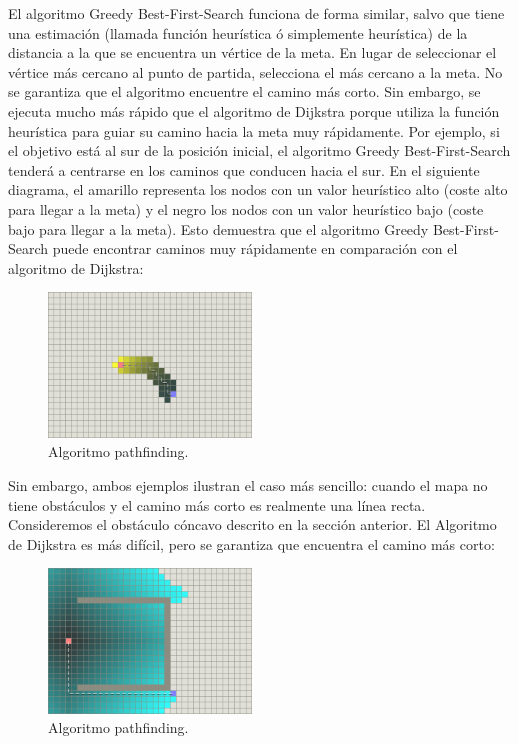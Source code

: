 \documentclass[reprint,amsmath,amssymb,aps]{revtex4-2}
\begin{document}
El algoritmo Greedy Best-First-Search funciona de forma similar, salvo que tiene una estimación (llamada función heurística ó simplemente heurística) de la distancia a la que se encuentra un vértice de la meta. En lugar de seleccionar el vértice más cercano al punto de partida, selecciona el más cercano a la meta. No se garantiza que el algoritmo encuentre el camino más corto. Sin embargo, se ejecuta mucho más rápido que el algoritmo de Dijkstra porque utiliza la función heurística para guiar su camino hacia la meta muy rápidamente. Por ejemplo, si el objetivo está al sur de la posición inicial, el algoritmo Greedy Best-First-Search tenderá a centrarse en los caminos que conducen hacia el sur. En el siguiente diagrama, el amarillo representa los nodos con un valor heurístico alto (coste alto para llegar a la meta) y el negro los nodos con un valor heurístico bajo (coste bajo para llegar a la meta). Esto demuestra que el algoritmo Greedy Best-First-Search puede encontrar caminos muy rápidamente en comparación con el algoritmo de Dijkstra:

\begin{figure}[H]
 	\centering
 	\includegraphics[width=0.48\textwidth]{greedy.png}
 	\caption{Algoritmo pathfinding.}
 	\label{a}
\end{figure}

Sin embargo, ambos ejemplos ilustran el caso más sencillo: cuando el mapa no tiene obstáculos y el camino más corto es realmente una línea recta. Consideremos el obstáculo cóncavo descrito en la sección anterior. El Algoritmo de Dijkstra es más difícil, pero se garantiza que encuentra el camino más corto:

\begin{figure}[H]
 	\centering
 	\includegraphics[width=0.48\textwidth]{dijkstra-trap.png}
 	\caption{Algoritmo pathfinding.}
 	\label{dijkstra-trap}
\end{figure}
 
\end{document}
